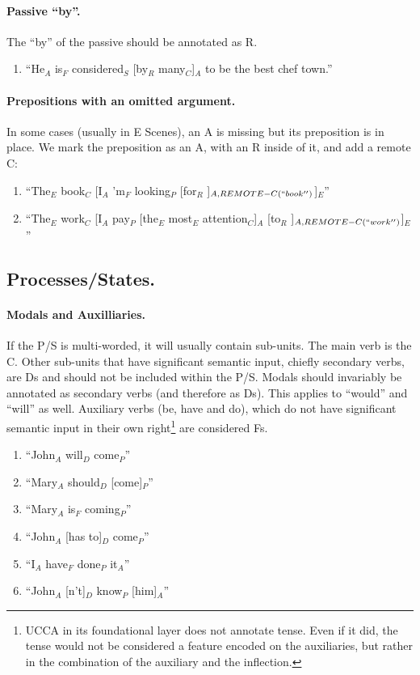 \documentclass[11pt]{article}
\newcommand{\be}{\begin{enumerate}}
\newcommand{\ee}{\end{enumerate}}
\begin{document}
\paragraph{Passive ``by''.} The ``by'' of the passive should be annotated as R.
\be \item
``He$_A$ is$_F$ considered$_S$ [by$_R$ many$_C$]$_A$ to be the best chef town.''
\ee

\paragraph{Prepositions with an omitted argument.} In some cases (usually in E Scenes), an A is missing but its preposition is in place. We mark the preposition as an A, with an R inside of it, and add a remote C:
\be \item
``The$_E$ book$_C$ [I$_A$ 'm$_F$ looking$_P$ [for$_R$ ]$_{A,REMOTE-C(``book'')}$]$_E$''
\item
``The$_E$ work$_C$ [I$_A$ pay$_P$ [the$_E$ most$_E$ attention$_C$]$_A$ [to$_R$ ]$_{A,REMOTE-C(``work'')}$]$_E$''
\ee

\subsection{Processes/States.}

\paragraph{Modals and Auxilliaries.} If the P/S is multi-worded, it will usually contain sub-units. The main verb is the C. Other sub-units that have significant semantic input, chiefly secondary verbs, are Ds and should not be included within the P/S. Modals should invariably be annotated as secondary verbs (and therefore as Ds). This applies to ``would'' and ``will'' as well. Auxiliary verbs (be, have and do), which do not have significant semantic input in their own right\footnote{UCCA in its foundational layer does not annotate tense. Even if it did, the tense would not be considered a feature encoded on the auxiliaries, but rather in the combination of the auxiliary and the inflection.} are considered Fs.
\be \item
``John$_A$ will$_D$ come$_P$''
\item
``Mary$_A$ should$_D$ [come]$_P$''
\item
``Mary$_A$ is$_F$ coming$_P$''
\item
``John$_A$ [has to]$_D$ come$_P$''
\item
``I$_A$ have$_F$ done$_P$ it$_A$''
\item
``John$_A$ [n't]$_D$ know$_P$ [him]$_A$''
\ee
\end{document}
